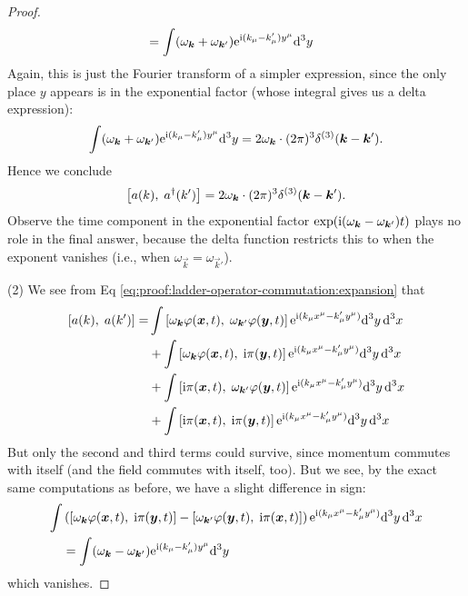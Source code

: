 \begin{proof}
\begin{equation}
\begin{split}
&=\int(\omega_{\vec{k}}+\omega_{\vec{k}'})\E^{\I(k_{\mu}-k'_{\mu})y^{\mu}}\D^{3}y
\end{split}
\end{equation}
Again, this is just the Fourier transform of a simpler expression, since
the only place $y$ appears is in the exponential factor (whose integral
gives us a delta expression):
\begin{equation}
\int(\omega_{\vec{k}}+\omega_{\vec{k}'})\E^{\I(k_{\mu}-k'_{\mu})y^{\mu}}\D^{3}y
=2\omega_{\vec{k}}\cdot(2\pi)^{3}\delta^{(3)}(\vec{k}-\vec{k}').
\end{equation}
Hence we conclude
\begin{equation}
\commutator{a(k)}{a^{\dagger}(k')} = 2\omega_{\vec{k}}\cdot(2\pi)^{3}\delta^{(3)}(\vec{k}-\vec{k}').
\end{equation}
Observe the time component in the exponential factor
$\exp(\I(\omega_{\vec{k}}-\omega_{\vec{k}'})t)$ plays no role in the
final answer, because the delta function restricts this to when the
exponent vanishes (i.e., when $\omega_{\vec{k}}=\omega_{\vec{k}'}$).

(2) We see from Eq
\eqref{eq:proof:ladder-operator-commutation:expansion} that
\begin{equation}
\begin{split}
\commutator{a(k)}{a(k')}
=&\int\commutator{\omega_{\vec{k}}\varphi(\vec{x},t)}{\omega_{\vec{k}'}\varphi(\vec{y},t)}\E^{\I (k_{\mu}x^{\mu}-k'_{\mu}y^{\mu})}\D^{3}y\,\D^{3}x\\
&+\int\commutator{\omega_{\vec{k}}\varphi(\vec{x},t)}{\I\pi(\vec{y},t)}\E^{\I (k_{\mu}x^{\mu}-k'_{\mu}y^{\mu})}\D^{3}y\,\D^{3}x\\
&+\int\commutator{\I\pi(\vec{x},t)}{\omega_{\vec{k}'}\varphi(\vec{y},t)}\E^{\I (k_{\mu}x^{\mu}-k'_{\mu}y^{\mu})}\D^{3}y\,\D^{3}x\\
&+\int\commutator{\I\pi(\vec{x},t)}{\I\pi(\vec{y},t)}\E^{\I (k_{\mu}x^{\mu}-k'_{\mu}y^{\mu})}\D^{3}y\,\D^{3}x
\end{split}
\end{equation}
But only the second and third terms could survive, since momentum
commutes with itself (and the field commutes with itself, too). But we
see, by the exact same computations as before, we have a slight
difference in sign:
\begin{equation}\label{eq:proof:ladder-operator-commutation:vanishing-expansion}
\begin{split}
\int&\left(\commutator{\omega_{\vec{k}}\varphi(\vec{x},t)}{\I\pi(\vec{y},t)}-\commutator{\omega_{\vec{k}'}\varphi(\vec{y},t)}{\I\pi(\vec{x},t)}\right)\E^{\I (k_{\mu}x^{\mu}-k'_{\mu}y^{\mu})}\D^{3}y\,\D^{3}x\\
&=
\int(\omega_{\vec{k}}-\omega_{\vec{k}'})\E^{\I(k_{\mu}-k'_{\mu})y^{\mu}}\D^{3}y
\end{split}
\end{equation}
which vanishes.


\end{proof}
